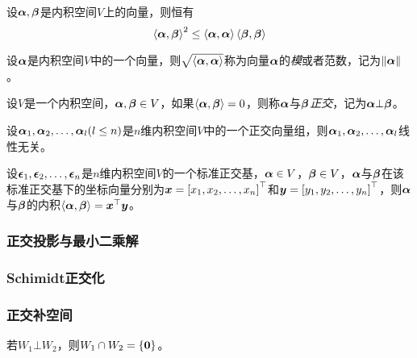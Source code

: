 \documentclass{ctexart}
\begin{document}
\begin{property}
    设\(\vecal,\vecbeta\)是内积空间\(V\)上的向量，则恒有
    \begin{equation*}
        \indot{\vecal}{\vecbeta}^2\le\indot{\vecal}{\vecal}\indot{\vecbeta}{\vecbeta}
    \end{equation*}
\end{property}

\begin{definition}[模]
    设\(\vecal\)是内积空间\(V\)中的一个向量，则\(\sqrt{\indot{\vecal}{\vecal}}\)称为向量\(\vecal\)的\emph{模}或者范数，记为\(\Abs{\vecal}\)。
\end{definition}

\begin{definition}[正交]
    设\(V\)是一个内积空间，\(\vecal,\vecbeta\in V\)，如果\(\indot{\vecal}{\vecbeta}=0\)，则称\(\vecal\)与\(\vecbeta\)\emph{正交}，记为\(\vecal\bot\vecbeta\)。
\end{definition}

\begin{theorem}
    设\(\enums{\vecal}{l}(l\le n)\)是\(n\)维内积空间\(V\)中的一个正交向量组，则\(\enums{\vecal}{l}\)线性无关。
\end{theorem}

\begin{theorem}
    设\(\enums{\veceps}{n}\)是\(n\)维内积空间\(V\)的一个标准正交基，\(\vecal\in V\)，\(\vecbeta\in V\)，\(\vecal\)与\(\vecbeta\)在该标准正交基下的坐标向量分别为\(\vecx=\mat{\enums{x}{n}}^\top\)和\(\vecy=\mat{\enums{y}{n}}^\top\)，则\(\vecal\)与\(\vecbeta\)的内积\(\indot{\vecal}{\vecbeta}=\vecx^\top\vecy\)。
\end{theorem}

\subsubsection*{正交投影与最小二乘解}

\subsubsection*{Schimidt正交化}

\subsubsection*{正交补空间}

\begin{theorem}
    若\(W_1\bot W_2\)，则\(W_1\cap W_2=\setof{\veczero}\)。
\end{theorem}
\end{document}
